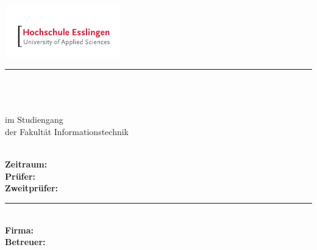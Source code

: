 \newcommand{\HRule}[2]{\noindent\rule[#1]{\linewidth}{#2}} %
\newcommand{\vlinespace}[1]{\vspace*{#1\baselineskip}} %
\newcommand{\titleemph}[1]{\textbf{#1}} %

\begin{titlepage}
 \sffamily %
      \hfill \includegraphics[width=5cm]{fig/aa-titel/HE_Logo_4c}
      \HRule{13pt}{2pt}
   \centering
      \Large
      \vlinespace{3}\\
      \workTyp\\
      \huge
      \workTitel\\
%
      \Large
      \vlinespace{2}
          im Studiengang \workStudiengang\\
          der Fakultät Informationstechnik\\
%
      \workSemester\\
%
      \vlinespace{2}
      \workNameStudent
%
   \vfill
   \raggedright
%
   \large
   \titleemph{Zeitraum:} \workZeitraum \\ %
   \titleemph{Prüfer:} \workPruefer \\
   \titleemph{Zweitprüfer:} \workZweitPruefer \\ %

   \vlinespace{1}
   \HRule{10pt}{2pt} \\
   \titleemph{Firma:} \workFirma \hfill \workFirmenLogo \\
   \titleemph{Betreuer:} \workBetreuer
%
\end{titlepage}
